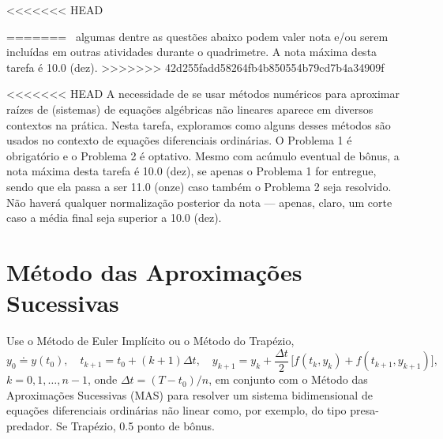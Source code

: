 \documentclass{article}
\begin{document}
<<<<<<< HEAD
\begin{comment}\vspace{2mm}
\noindent {\bf ATENÇÃO:}\, algumas dentre as questões abaixo podem valer nota e/ou serem incluídas em outras atividades durante o quadrimetre. A nota máxima desta tarefa é 10.0 (dez).
\end{comment}
=======
\vspace{2mm}
\, algumas dentre as questões abaixo podem valer nota e/ou serem incluídas em outras atividades durante o quadrimetre. A nota máxima desta tarefa é 10.0 (dez).
>>>>>>> 42d255fadd58264fb4b850554b79cd7b4a34909f

\mbox{}
\vspace{5mm}

<<<<<<< HEAD
A necessidade de se usar métodos numéricos para aproximar raízes de (sistemas) de equações algébricas não lineares aparece em diversos contextos na prática. Nesta tarefa, exploramos como alguns desses métodos são usados no contexto de equações diferenciais ordinárias. 
O Problema 1 é obrigatório e o Problema 2 é optativo. Mesmo com acúmulo eventual de bônus, a nota máxima desta tarefa é 10.0 (dez), se apenas o Problema 1 for entregue, sendo que ela passa a ser 11.0 (onze) caso também o Problema 2 seja resolvido. Não haverá qualquer normalização posterior da nota --- apenas, claro, um corte caso a média final seja superior a 10.0 (dez).

\section{Método das Aproximações Sucessivas}
Use o Método de Euler Implícito ou o Método do Trapézio, 
\[ y_0\doteq y(t_0),\quad t_{k+1}=t_0+(k+1)\Delta t,\quad y_{k+1}=y_k+\frac{\Delta t}{2}\,\Big[f(t_k,y_k)+f(t_{k+1},y_{k+1})\Big], 
\] 
$k=0,1,\ldots , n-1$, onde $\Delta t=(T-t_0)/n$,
em conjunto com o Método das Aproxi\-mações Sucessivas (MAS) para resolver um sistema bidimensional de equações diferenciais ordinárias não linear como, por exemplo, do tipo presa-predador. Se Trapézio, 0.5 ponto de bônus.  
\end{document}
